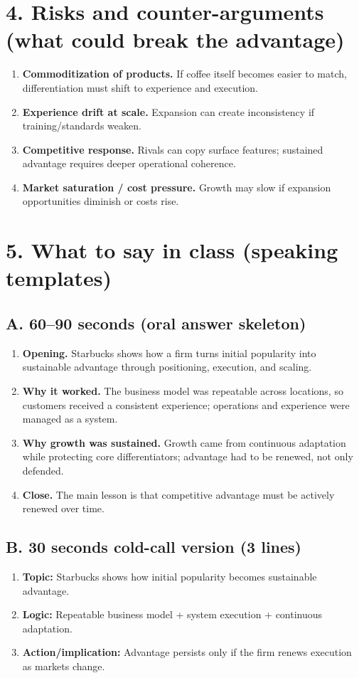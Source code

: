 \documentclass[10pt,a4paper]{article}
\begin{document}
\section*{\color{eublue}4. Risks and counter-arguments (what could break the advantage)}
\begin{enumerate}
  \item \textbf{Commoditization of products.} If coffee itself becomes easier to match, differentiation must shift to experience and execution.
  \item \textbf{Experience drift at scale.} Expansion can create inconsistency if training/standards weaken.
  \item \textbf{Competitive response.} Rivals can copy surface features; sustained advantage requires deeper operational coherence.
  \item \textbf{Market saturation / cost pressure.} Growth may slow if expansion opportunities diminish or costs rise.
\end{enumerate}

\section*{\color{eublue}5. What to say in class (speaking templates)}
\subsection*{\color{eublue}A. 60--90 seconds (oral answer skeleton)}
\begin{enumerate}
  \item \textbf{Opening.} Starbucks shows how a firm turns initial popularity into sustainable advantage through positioning, execution, and scaling.
  \item \textbf{Why it worked.} The business model was repeatable across locations, so customers received a consistent experience; operations and experience were managed as a system.
  \item \textbf{Why growth was sustained.} Growth came from continuous adaptation while protecting core differentiators; advantage had to be renewed, not only defended.
  \item \textbf{Close.} The main lesson is that competitive advantage must be actively renewed over time.
\end{enumerate}

\subsection*{\color{eublue}B. 30 seconds cold-call version (3 lines)}
\begin{enumerate}
  \item \textbf{Topic:} Starbucks shows how initial popularity becomes sustainable advantage.
  \item \textbf{Logic:} Repeatable business model + system execution + continuous adaptation.
  \item \textbf{Action/implication:} Advantage persists only if the firm renews execution as markets change.
\end{enumerate}
\end{document}
